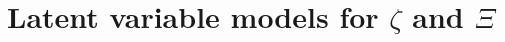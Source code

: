 \chapter{Latent variable models for \texorpdfstring{$\zeta$}{zeta} and \texorpdfstring{$\Xi$}{Xi}}\label{vol3:ch37}


